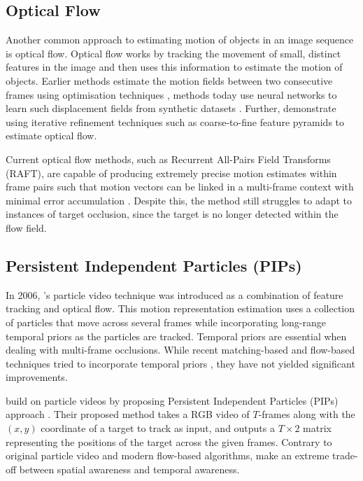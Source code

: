 \documentclass{l4proj}
\begin{document}
\subsection{Optical Flow}

Another common approach to estimating motion of objects in an image sequence is optical flow. Optical flow works by tracking the movement of small, distinct features in the image and then uses this information to estimate the motion of objects. Earlier methods estimate the motion fields between two consecutive frames using optimisation techniques \citep{DBLP:journals/pami/BroxM11, DBLP:conf/eccv/SundaramBK10},  methods today use neural networks to learn such displacement fields from synthetic datasets \citep{DBLP:conf/cvpr/IlgMSKDB17}.  Further, \cite{DBLP:journals/corr/abs-1709-02371} demonstrate using iterative refinement techniques such as coarse-to-fine feature pyramids to estimate optical flow.

Current optical flow methods, such as Recurrent All-Pairs Field Transforms (RAFT), are capable of producing extremely precise motion estimates within frame pairs such that motion vectors can be linked in a multi-frame context with minimal error accumulation \citep{DBLP:journals/corr/abs-2003-12039}. Despite this, the method still struggles to adapt to instances of target occlusion, since the target is no longer detected within the flow field.

\subsection{Persistent Independent Particles (PIPs) }
In 2006, \citeauthor{SandTeller06}'s particle video technique was introduced as a combination of feature tracking and optical flow. This motion representation estimation uses a collection of particles that move across several frames while incorporating long-range temporal priors as the particles are tracked.  Temporal priors are essential when dealing with multi-frame occlusions. While recent matching-based and flow-based techniques  tried to incorporate temporal priors \citep{DBLP:journals/corr/abs-1810-10066}, they have not yielded significant improvements.

\cite{DBLP:journals/corr/abs-2204-04153} build on particle videos by proposing Persistent Independent Particles (PIPs) approach . Their proposed method takes a RGB video of $T$-frames  along with the $(x, y)$ coordinate of a target to track as input, and outputs a $T\times2$ matrix representing the positions of the target across the given frames. Contrary to original particle video and modern flow-based algorithms, \citeauthor{DBLP:journals/corr/abs-2204-04153} make an extreme trade-off between spatial awareness and temporal awareness.
\end{document}
